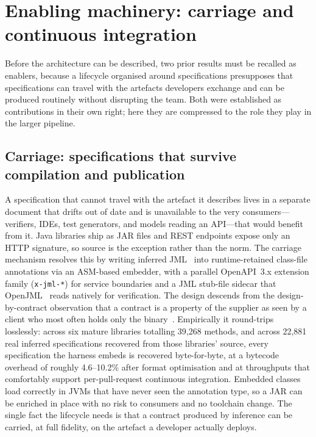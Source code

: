 \section{Enabling machinery: carriage and continuous integration}\label{sec:int-enablers}

Before the architecture can be described, two prior results must be recalled as
enablers, because a lifecycle organised around specifications presupposes that
specifications can travel with the artefacts developers exchange and can be
produced routinely without disrupting the team. Both were established as
contributions in their own right; here they are compressed to the role they play
in the larger pipeline.

\subsection{Carriage: specifications that survive compilation and publication}\label{sec:int-carriage}

A specification that cannot travel with the artefact it describes lives in a
separate document that drifts out of date and is unavailable to the very
consumers---verifiers, IDEs, test generators, and models reading an API---that
would benefit from it. Java libraries ship as JAR files and REST endpoints expose
only an HTTP signature, so source is the exception rather than the norm. The
carriage mechanism resolves this by writing inferred JML~\citep{leavens2006jml}
into runtime-retained class-file annotations via an ASM-based embedder, with a
parallel OpenAPI~3.x extension family (\texttt{x-jml-*}) for service boundaries and
a JML stub-file sidecar that OpenJML~\citep{cok2014openjml} reads natively for
verification. The design descends from the design-by-contract observation that a
contract is a property of the supplier as seen by a client who most often holds
only the binary~\citep{meyer1992dbc}. Empirically it round-trips losslessly:
across six mature libraries totalling 39{,}268 methods, and across 22{,}881 real
inferred specifications recovered from those libraries' source, every specification
the harness embeds is recovered byte-for-byte, at a bytecode overhead of roughly
4.6--10.2\% after format optimisation and at throughputs that comfortably support
per-pull-request continuous integration. Embedded classes load correctly in JVMs
that have never seen the annotation type, so a JAR can be enriched in place with no
risk to consumers and no toolchain change. The single fact the lifecycle needs is
that a contract produced by inference can be carried, at full fidelity, on the
artefact a developer actually deploys.

